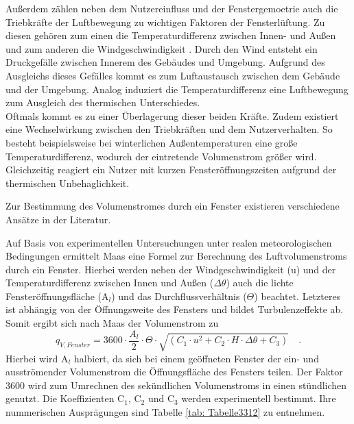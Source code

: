 Außerdem zählen neben dem Nutzereinfluss und der Fenstergemoetrie auch die Triebkräfte der Luftbewegung zu wichtigen Faktoren der Fensterlüftung.
Zu diesen gehören zum einen die Temperaturdifferenz zwischen Innen- und Außen und zum anderen die Windgeschwindigkeit \cite{Schild.2013b}.
Durch den Wind entsteht ein Druckgefälle zwischen Innerem des Gebäudes und Umgebung.
Aufgrund des Ausgleichs dieses Gefälles kommt es zum Luftaustausch zwischen dem Gebäude und der Umgebung.
Analog induziert die Temperaturdifferenz eine Luftbewegung zum Ausgleich des thermischen Unterschiedes. \cite{Maas.2017} \\
Oftmals kommt es zu einer Überlagerung dieser beiden Kräfte.
Zudem existiert eine Wechselwirkung zwischen den Triebkräften und dem Nutzerverhalten.
So besteht beispielsweise bei winterlichen Außentemperaturen eine große Temperaturdifferenz, wodurch der eintretende Volumenstrom größer wird.
Gleichzeitig reagiert ein Nutzer mit kurzen Fensteröffnungszeiten aufgrund der thermischen Unbehaglichkeit. 

Zur Bestimmung des Volumenstromes durch ein Fenster existieren verschiedene Ansätze in der Literatur.

Auf Basis von experimentellen Untersuchungen unter realen meteorologischen Bedingungen ermittelt Maas \cite{Maas.1995} eine Formel zur Berechnung des Luftvolumenstroms durch ein Fenster.
Hierbei werden neben der Windgeschwindigkeit (u) und der Temperaturdifferenz zwischen Innen und Außen (\(\Delta \theta\)) auch die lichte Fensteröffnungsfläche (A\(_l\)) und das Durchflussverhältnis (\(\Theta\)) beachtet. 
Letzteres ist abhängig von der Öffnungsweite des Fensters und bildet Turbulenzeffekte ab.
Somit ergibt sich nach Maas der Volumenstrom zu
\begin{equation}
\label{eq:Gleichung3311}
q_{V, Fenster} = 3600 \cdot \frac{A_l}{2} \cdot \Theta \cdot \sqrt{(C_1 \cdot u^2 + C_2 \cdot H \cdot \Delta \theta + C_3)} \quad \text{.}
\end{equation}
Hierbei wird A\(_l\) halbiert, da sich bei einem geöffneten Fenster der ein- und ausströmender Volumenstrom die Öffnungsfläche des Fensters teilen.
Der Faktor 3600 wird zum Umrechnen des sekündlichen Volumenstroms in einen stündlichen genutzt.
Die Koeffizienten C\(_1\), C\(_2\) und C\(_3\) werden experimentell bestimmt.
Ihre nummerischen Ausprägungen sind Tabelle \ref{tab: Tabelle3312} zu entnehmen.

